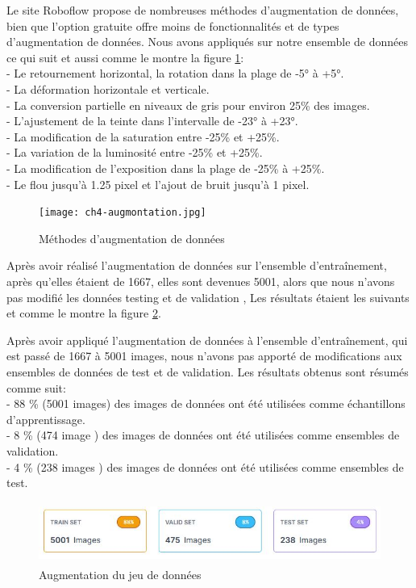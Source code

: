 Le site Roboflow propose de nombreuses méthodes d'augmentation de données, bien que l'option gratuite offre moins de fonctionnalités et de types d'augmentation de données. Nous avons appliqués sur notre ensemble de données ce qui suit et aussi comme le montre la figure \ref{fig:Augmentation_roboflow}:
\\
- Le retournement horizontal, la rotation dans la plage de -5° à +5°.\\
- La déformation horizontale et verticale.\\
- La conversion partielle en niveaux de gris pour environ 25\% des images.\\
- L'ajustement de la teinte dans l'intervalle de -23° à +23°.\\
- La modification de la saturation entre -25\% et +25\%.\\
- La variation de la luminosité entre -25\% et +25\%.\\
- La modification de l'exposition dans la plage de -25\% à +25\%.\\
- Le flou jusqu'à 1.25 pixel et l'ajout de bruit jusqu'à 1 pixel.\\

\begin{figure}[H]
	\centering
	\texttt{[image: ch4-augmontation.jpg]}
	\caption{Méthodes d'augmentation de données}
    \label{fig:Augmentation_roboflow}
\end{figure}

Après avoir réalisé l'augmentation de données sur l'ensemble d'entraînement,  après qu'elles étaient de 1667, elles sont devenues 5001, alors que nous n'avons pas modifié les données testing et de validation , Les résultats étaient les suivants et comme le montre la figure \ref{fig:Aug}.

Après avoir appliqué l'augmentation de données à l'ensemble d'entraînement, qui est passé de 1667 à 5001 images, nous n'avons pas apporté de modifications aux ensembles de données de test et de validation. Les résultats obtenus sont résumés comme suit:\\
- 88 \% (5001 images) des images de données ont été utilisées comme échantillons d'apprentissage.\\ 
- 8 \% (474 image ) des images de données ont été utilisées comme ensembles de validation.\\ 
- 4 \% (238 images ) des images de données ont été utilisées comme ensembles de test.

\begin{figure}[H]
	\centering
	\includegraphics[height=02cm]{img/ch4-Augmentation_car+plate.jpg}
	\caption{Augmentation du jeu de données}
 \label{fig:Aug}
\end{figure}

